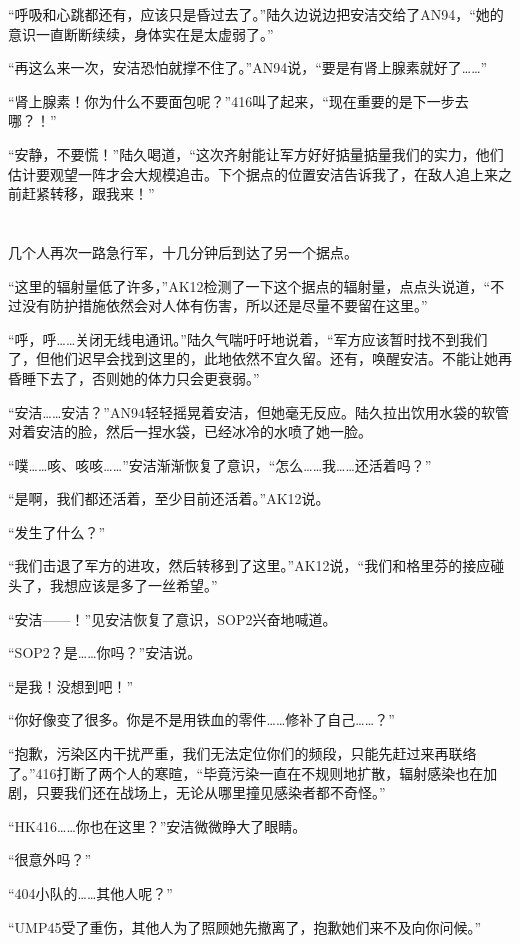 “呼吸和心跳都还有，应该只是昏过去了。”陆久边说边把安洁交给了AN94，“她的意识一直断断续续，身体实在是太虚弱了。”

“再这么来一次，安洁恐怕就撑不住了。”AN94说，“要是有肾上腺素就好了……”

“肾上腺素！你为什么不要面包呢？”416叫了起来，“现在重要的是下一步去哪？！”

“安静，不要慌！”陆久喝道，“这次齐射能让军方好好掂量掂量我们的实力，他们估计要观望一阵才会大规模追击。下个据点的位置安洁告诉我了，在敌人追上来之前赶紧转移，跟我来！”

\section*{}

几个人再次一路急行军，十几分钟后到达了另一个据点。

“这里的辐射量低了许多，”AK12检测了一下这个据点的辐射量，点点头说道，“不过没有防护措施依然会对人体有伤害，所以还是尽量不要留在这里。”

“呼，呼……关闭无线电通讯。”陆久气喘吁吁地说着，“军方应该暂时找不到我们了，但他们迟早会找到这里的，此地依然不宜久留。还有，唤醒安洁。不能让她再昏睡下去了，否则她的体力只会更衰弱。”

“安洁……安洁？”AN94轻轻摇晃着安洁，但她毫无反应。陆久拉出饮用水袋的软管对着安洁的脸，然后一捏水袋，已经冰冷的水喷了她一脸。

“噗……咳、咳咳……”安洁渐渐恢复了意识，“怎么……我……还活着吗？”

“是啊，我们都还活着，至少目前还活着。”AK12说。

“发生了什么？”

“我们击退了军方的进攻，然后转移到了这里。”AK12说，“我们和格里芬的接应碰头了，我想应该是多了一丝希望。”

“安洁——！”见安洁恢复了意识，SOP2兴奋地喊道。

“SOP2？是……你吗？”安洁说。

“是我！没想到吧！”

“你好像变了很多。你是不是用铁血的零件……修补了自己……？”

“抱歉，污染区内干扰严重，我们无法定位你们的频段，只能先赶过来再联络了。”416打断了两个人的寒暄，“毕竟污染一直在不规则地扩散，辐射感染也在加剧，只要我们还在战场上，无论从哪里撞见感染者都不奇怪。”

“HK416……你也在这里？”安洁微微睁大了眼睛。

“很意外吗？”

“404小队的……其他人呢？”

“UMP45受了重伤，其他人为了照顾她先撤离了，抱歉她们来不及向你问候。”


